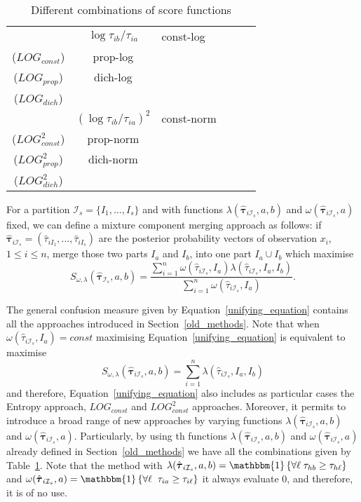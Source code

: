 \documentclass[10pt, a4paper]{article}
\newcommand{\m}[1]{\boldsymbol{#1}}
\begin{document}
\begin{table}
\begin{tabular}{c  c | >{\centering}m{0.7in} | >{\centering}m{0.8in} | >{\centering}m{0.7in} | m{0in}}
& $\log{\tau_{i b} / \tau_{i a}}$ & {\small const-log}\\($LOG_{const}$) & {\small prop-log}\\($LOG_{prop}$) & {\small dich-log}\\($LOG_{dich}$) &\\[5em] \cline{3-5}

& $(\log{\tau_{i b} / \tau_{i a}})^2$ & {\small const-norm}\\($LOG^2_{const}$) & {\small prop-norm}\\($LOG^2_{prop}$) & {\small dich-norm}\\($LOG^2_{dich}$)  &\\[5em] \cline{3-5}
\end{tabular}
\caption{Different combinations of score functions}
\label{table_methods}
\end{table}

For a partition $\mathcal{I}_s = \{ I_1, \dots, I_s\}$ and with  functions $\lambda(\hat{\m \tau}_{i \mathcal{I}_s}, a, b)$ and $\omega(\hat{\m \tau}_{i \mathcal{I}_s}, a)$ fixed, we can define a mixture component merging approach as follows: if $\hat{\m\tau}_{i \mathcal{I}_s} = \left( \hat{\tau}_{i I_1} , \dots, \hat{\tau}_{i I_s}  \right)$ are the posterior probability vectors of observation $x_i$, $1 \leq i \leq n$,  merge those two parts $I_a$ and $I_b$, into one part $I_a \cup I_b$ which maximise
\begin{equation}\label{unifying_equation}
S_{\omega, \lambda}( \hat{\m \tau}_{\mathcal{I}_s}, a, b) = \frac{\sum_{i=1}^n \omega(\hat{\tau}_{i \mathcal{I}_s}, I_a) \lambda(\hat{\tau}_{i \mathcal{I}_s}, I_a, I_b)}{\sum_{i=1}^n \omega(\hat{\tau}_{i \mathcal{I}_s}, I_a) }.
\end{equation}


The general confusion measure given by Equation~\ref{unifying_equation} contains all the approaches introduced in Section~\ref{old_methods}. Note that when $\omega(\hat{\tau}_{i \mathcal{I}_s}, I_a) = const$ maximising Equation~\ref{unifying_equation} is equivalent to maximise
\[
S_{\omega, \lambda}( \hat{\m \tau}_{i \mathcal{I}_s}, a, b) = \sum_{i=1}^n \lambda(\hat{\tau}_{i \mathcal{I}_s}, I_a, I_b)
\]
and therefore, Equation~\ref{unifying_equation} also includes as particular cases the Entropy approach, $LOG_{const}$ and $LOG^2_{const}$ approaches. Moreover, it permits to introduce a broad range of new approaches by varying functions $\lambda(\hat{\m \tau}_{i \mathcal{I}_s}, a, b)$ and $\omega(\hat{\m \tau}_{i \mathcal{I}_s}, a)$. Particularly, by using th functions $\lambda(\hat{\m \tau}_{i \mathcal{I}_s}, a, b)$ and $\omega(\hat{\m \tau}_{i \mathcal{I}_s}, a)$ already defined in Section~\ref{old_methods} we have all the combinations given by Table~\ref{table_methods}. Note that the method with $\lambda(\hat{\m \tau}_{i \mathcal{I}_s}, a, b) =  \mathlarger{\mathbbm{1}}\left\{  \forall \ell \; \tau_{hb} \geq \tau_{h\ell}  \right\}$ and  $\omega(\hat{\m \tau}_{i \mathcal{I}_s}, a) = \mathlarger{\mathbbm{1}}\left\{  \forall \ell\; \; \tau_{ia} \geq \tau_{i\ell}  \right\}$ it always evaluate 0, and therefore, it is of no use.
\end{document}
